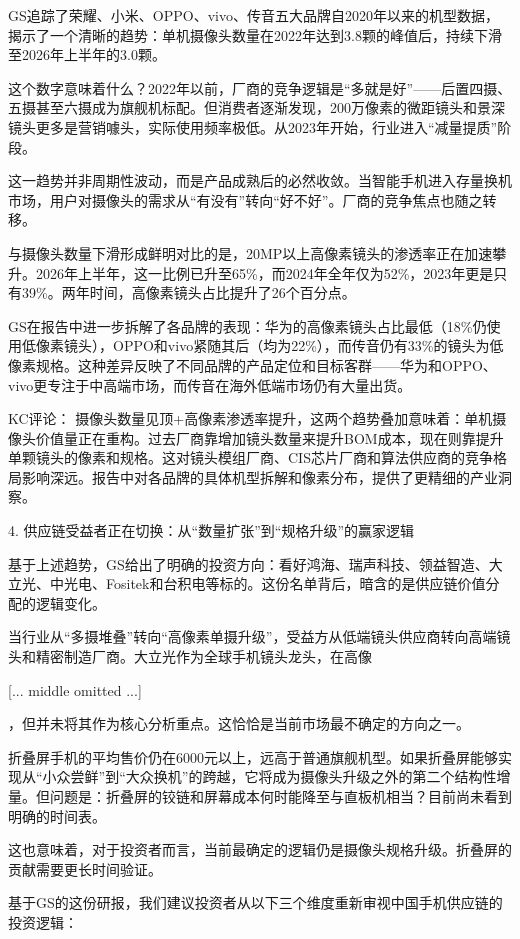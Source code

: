 \documentclass[11pt]{ctexart}
\begin{document}
GS追踪了荣耀、小米、OPPO、vivo、传音五大品牌自2020年以来的机型数据，揭示了一个清晰的趋势：单机摄像头数量在2022年达到3.8颗的峰值后，持续下滑至2026年上半年的3.0颗。

这个数字意味着什么？2022年以前，厂商的竞争逻辑是“多就是好”——后置四摄、五摄甚至六摄成为旗舰机标配。但消费者逐渐发现，200万像素的微距镜头和景深镜头更多是营销噱头，实际使用频率极低。从2023年开始，行业进入“减量提质”阶段。

这一趋势并非周期性波动，而是产品成熟后的必然收敛。当智能手机进入存量换机市场，用户对摄像头的需求从“有没有”转向“好不好”。厂商的竞争焦点也随之转移。

与摄像头数量下滑形成鲜明对比的是，20MP以上高像素镜头的渗透率正在加速攀升。2026年上半年，这一比例已升至65\%，而2024年全年仅为52\%，2023年更是只有39\%。两年时间，高像素镜头占比提升了26个百分点。

GS在报告中进一步拆解了各品牌的表现：华为的高像素镜头占比最低（18\%仍使用低像素镜头），OPPO和vivo紧随其后（均为22\%），而传音仍有33\%的镜头为低像素规格。这种差异反映了不同品牌的产品定位和目标客群——华为和OPPO、vivo更专注于中高端市场，而传音在海外低端市场仍有大量出货。

KC评论： 摄像头数量见顶+高像素渗透率提升，这两个趋势叠加意味着：单机摄像头价值量正在重构。过去厂商靠增加镜头数量来提升BOM成本，现在则靠提升单颗镜头的像素和规格。这对镜头模组厂商、CIS芯片厂商和算法供应商的竞争格局影响深远。报告中对各品牌的具体机型拆解和像素分布，提供了更精细的产业洞察。

4. 供应链受益者正在切换：从“数量扩张”到“规格升级”的赢家逻辑

基于上述趋势，GS给出了明确的投资方向：看好鸿海、瑞声科技、领益智造、大立光、中光电、Fositek和台积电等标的。这份名单背后，暗含的是供应链价值分配的逻辑变化。

当行业从“多摄堆叠”转向“高像素单摄升级”，受益方从低端镜头供应商转向高端镜头和精密制造厂商。大立光作为全球手机镜头龙头，在高像

[... middle omitted ...]

，但并未将其作为核心分析重点。这恰恰是当前市场最不确定的方向之一。

折叠屏手机的平均售价仍在6000元以上，远高于普通旗舰机型。如果折叠屏能够实现从“小众尝鲜”到“大众换机”的跨越，它将成为摄像头升级之外的第二个结构性增量。但问题是：折叠屏的铰链和屏幕成本何时能降至与直板机相当？目前尚未看到明确的时间表。

这也意味着，对于投资者而言，当前最确定的逻辑仍是摄像头规格升级。折叠屏的贡献需要更长时间验证。

基于GS的这份研报，我们建议投资者从以下三个维度重新审视中国手机供应链的投资逻辑：
\end{document}
